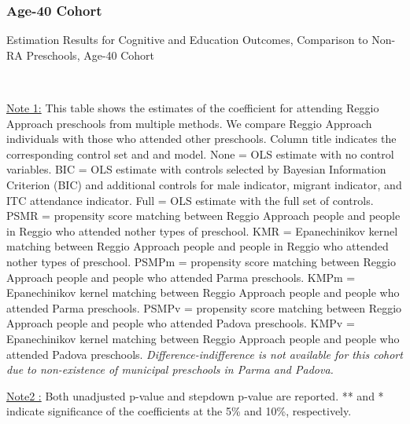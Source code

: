 \subsubsection{Age-40 Cohort}
\begin{table}[H] \caption{Estimation Results for Cognitive and Education Outcomes, Comparison to Non-RA Preschools, Age-40 Cohort} \label{ols-CN-adult40-reg-other}
\scalebox{0.6}{}
\vspace{1ex} \\
\footnotesize\raggedright{\underline{Note 1:} This table shows the estimates of the coefficient for attending Reggio Approach preschools from multiple methods. We compare Reggio Approach individuals with those who attended other preschools. Column title indicates the corresponding control set and and model. None = OLS estimate with no control variables. BIC = OLS estimate with controls selected by Bayesian Information Criterion (BIC) and additional controls for male indicator, migrant indicator, and ITC attendance indicator. Full = OLS estimate with the full set of controls. PSMR =  propensity score matching between Reggio Approach people and people in Reggio who attended nother types of preschool. KMR = Epanechinikov kernel matching between Reggio Approach people and people in Reggio who attended nother types of preschool. PSMPm = propensity score matching between Reggio Approach people and people who attended Parma preschools. KMPm = Epanechinikov kernel matching between Reggio Approach people and people who attended Parma preschools. PSMPv = propensity score matching between Reggio Approach people and people who attended Padova preschools. KMPv = Epanechinikov kernel matching between Reggio Approach people and people who attended Padova preschools. \textit{Difference-indifference is not available for this cohort due to non-existence of municipal preschools in Parma and Padova.}}

\footnotesize\raggedright{\underline{Note2 :} Both unadjusted p-value and stepdown p-value are reported. ** and * indicate significance of the coefficients at the 5\% and 10\%, respectively.}
\end{table}

